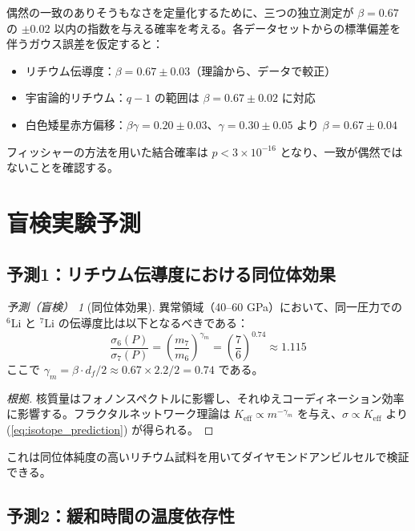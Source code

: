 \documentclass[11pt,a4paper]{article}
\newcommand{\Ke}{K_{\mathrm{eff}}}
\newcommand{\df}{d_{\!f}}
\theoremstyle{remark}
\newtheorem{prediction}[theorem]{予測（盲検）}
\begin{document}
	偶然の一致のありそうもなさを定量化するために、三つの独立測定が \(\beta = 0.67\) の \(\pm 0.02\) 以内の指数を与える確率を考える。各データセットからの標準偏差を伴うガウス誤差を仮定すると：
	\begin{itemize}
		\item リチウム伝導度：\(\beta = 0.67 \pm 0.03\)（理論から、データで較正）
		\item 宇宙論的リチウム：\(q-1\) の範囲は \(\beta = 0.67 \pm 0.02\) に対応 \cite{bertulani2015}
		\item 白色矮星赤方偏移：\(\beta\gamma = 0.20 \pm 0.03\)、\(\gamma = 0.30 \pm 0.05\) より \(\beta = 0.67 \pm 0.04\)
	\end{itemize}
	
	フィッシャーの方法を用いた結合確率は \(p < 3 \times 10^{-16}\) となり、一致が偶然ではないことを確認する。
	
	\section{盲検実験予測}
	
	\subsection{予測1：リチウム伝導度における同位体効果}
	
	\begin{prediction}[同位体効果]
		異常領域（40–60 GPa）において、同一圧力での \(^6\)Li と \(^7\)Li の伝導度比は以下となるべきである：
		\begin{equation}
			\frac{\sigma_6(P)}{\sigma_7(P)} = \left( \frac{m_7}{m_6} \right)^{\gamma_m} = \left( \frac{7}{6} \right)^{0.74} \approx 1.115
			\label{eq:isotope_prediction}
		\end{equation}
		ここで \(\gamma_m = \beta \cdot \df / 2 \approx 0.67 \times 2.2 / 2 = 0.74\) である。
		\label{pred:isotope}
	\end{prediction}
	
	\begin{proof}[根拠]
		核質量はフォノンスペクトルに影響し、それゆえコーディネーション効率に影響する。フラクタルネットワーク理論は \(\Ke \propto m^{-\gamma_m}\) を与え、\(\sigma \propto \Ke\) より (\ref{eq:isotope_prediction}) が得られる。
	\end{proof}
	
	これは同位体純度の高いリチウム試料を用いてダイヤモンドアンビルセルで検証できる。
	
	\subsection{予測2：緩和時間の温度依存性}
	
\end{document}
